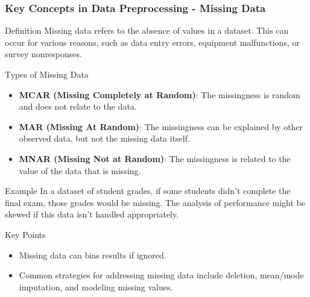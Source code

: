 \documentclass[aspectratio=169]{beamer}
\begin{document}
\begin{frame}[fragile]
    \frametitle{Key Concepts in Data Preprocessing - Missing Data}
    \begin{block}{Definition}
        Missing data refers to the absence of values in a dataset. This can occur for various reasons, such as data entry errors, equipment malfunctions, or survey nonresponses.
    \end{block}

    \begin{block}{Types of Missing Data}
        \begin{itemize}
            \item \textbf{MCAR (Missing Completely at Random)}: The missingness is random and does not relate to the data.
            \item \textbf{MAR (Missing At Random)}: The missingness can be explained by other observed data, but not the missing data itself.
            \item \textbf{MNAR (Missing Not at Random)}: The missingness is related to the value of the data that is missing.
        \end{itemize}
    \end{block}

    \begin{block}{Example}
        In a dataset of student grades, if some students didn't complete the final exam, those grades would be missing. 
        The analysis of performance might be skewed if this data isn't handled appropriately.
    \end{block}

    \begin{block}{Key Points}
        \begin{itemize}
            \item Missing data can bias results if ignored.
            \item Common strategies for addressing missing data include deletion, mean/mode imputation, and modeling missing values.
        \end{itemize}
    \end{block}
\end{frame}
\end{document}
